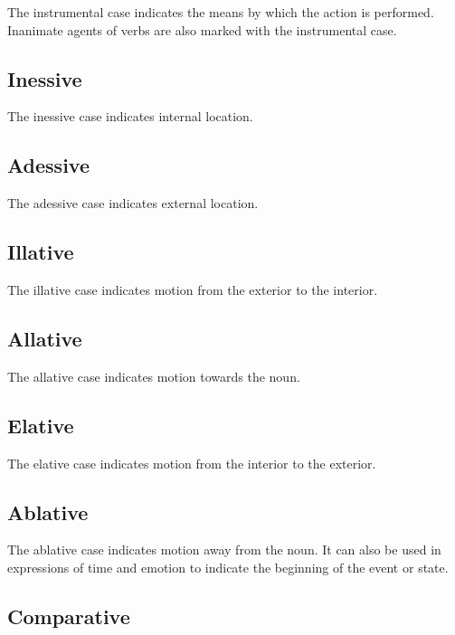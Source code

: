 \documentclass[grammar]{subfiles}
\begin{document}
The instrumental case indicates the means by which the action is
performed.  Inanimate agents of verbs are also marked with the instrumental case.  


\subsection{Inessive}
\label{ssec:ns_inessive_case}

The inessive case indicates internal location.  


\subsection{Adessive}
\label{ssec:ns_adessive_case}

The adessive case indicates external location.


\subsection{Illative}
\label{ssec:ns_illative_case}

The illative case indicates motion from the exterior to the interior.


\subsection{Allative}
\label{ssec:ns_allative_case}

The allative case indicates motion towards the noun. 


\subsection{Elative}
\label{ssec:ns_elative_case}

The elative case indicates motion from the interior to the exterior.


\subsection{Ablative}
\label{ssec:ns_ablative_case}

The ablative case indicates motion away from the noun.  It can also be used
in expressions of time and emotion to indicate the beginning of the event or
state. 


\subsection{Comparative}
\label{ssec:ns_comparative_case}
\end{document}
